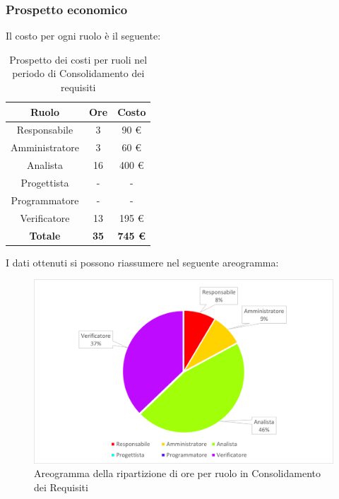 \subsubsection{Prospetto economico}
Il costo per ogni ruolo è il seguente:
\begin{table}[H]
		\begin{center}
			\setlength{\aboverulesep}{0pt}
			\setlength{\belowrulesep}{0pt}
			\setlength{\extrarowheight}{.75ex}
			\begin{tabular}{ c c c }
				\rowcolor{AzzurroGruppo!30} 
				\textbf{Ruolo} & \textbf{Ore} & \textbf{Costo}  \\
				\toprule
				Responsabile   & 3 & 90 \euro \\
				Amministratore & 3 & 60 \euro \\
				Analista       & 16 & 400 \euro \\
				Progettista    & - & - \\
				Programmatore  & - & - \\
				Verificatore   & 13 & 195 \euro \\
				\textbf{Totale} & \textbf{35} & \textbf{745 \euro} \\
				\bottomrule
			\end{tabular}
			\caption{ Prospetto dei costi per ruoli nel periodo di Consolidamento dei requisiti}
		\end{center}
	\end{table}
I dati ottenuti si possono riassumere nel seguente areogramma:
\begin{figure}[H]
    \centering
    \includegraphics[scale = 0.5]{components/img/Analisi-consolidamento-torta.png}
    \caption{ Areogramma della ripartizione di ore per ruolo in Consolidamento dei Requisiti}
    \label{fig:Areogramma ripartizione ore, fase di Consolidamento dei requisiti}
\end{figure}
